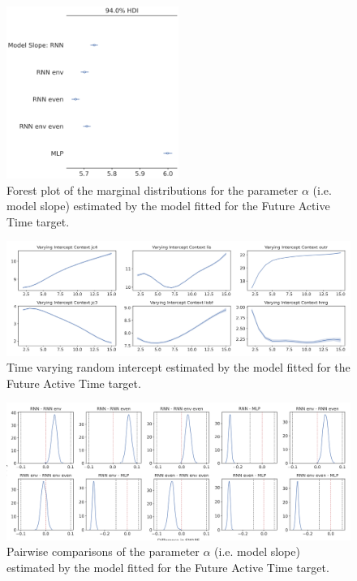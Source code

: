 \begin{figure}[H]
\centering
\includegraphics[width=0.5\textwidth]{images/appendix_C/Future Active Time_models_3.png}
\caption[\textbf{Future active time model fixed effect}]{Forest plot of the marginal distributions for the parameter $\alpha$ (i.e. model slope) estimated by the model fitted for the Future Active Time target.}
\label{model_act_3}
\end{figure}

\begin{figure}[H]
\centering
\includegraphics[width=\textwidth]{images/appendix_C/Future Active Time_interc_3.png}
\caption[\textbf{Future active time time-varying random intercept}]{Time varying random intercept estimated by the model fitted for the Future Active Time target.}
\label{interc_act_3}
\end{figure}

\begin{figure}[H]
\centering
\includegraphics[width=\textwidth]{images/appendix_C/Future_Active_Time_comp_3.png}
\caption[\textbf{Future active time pairwise comparisons of model fixed effect}]{Pairwise comparisons of the parameter $\alpha$ (i.e. model slope) estimated by the model fitted for the Future Active Time target.}
\label{comp_act_3}
\end{figure}

